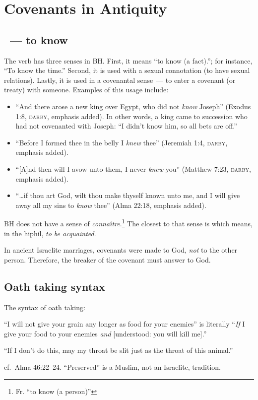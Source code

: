 \chapter{Covenants in Antiquity}\label{app:covenants-in-antiquity}
\section{~--- to know}
The verb  has three senses in BH. First, it means ``to know (a fact).''; for instance, ``To know the time.'' Second, it is used with a sexual connotation (to have sexual relations). Lastly, it is used in a covenantal sense~--- to enter a covenant (or treaty) with someone. Examples of this usage include:
\begin{itemize}
    \item ``And there arose a new king over Egypt, who did not \emph{know} Joseph'' (Exodus 1:8, \textsc{darby}, emphasis added). In other words, a king came to succession who had not covenanted with Joseph: ``I didn't know him, so all bets are off.''
    \item ``Before I formed thee in the belly I \emph{knew} thee'' (Jeremiah 1:4, \textsc{darby}, emphasis added).
    \item ``[A]nd then will I avow unto them, I never \emph{knew} you'' (Matthew 7:23, \textsc{darby}, emphasis added).
    \item ``\dots if thou art God, wilt thou make thyself known unto me, and I will give away all my sins to \emph{know} thee'' (Alma 22:18, emphasis added).
\end{itemize}

BH does not have a sense of \emph{conna\^\i tre}.\footnote{Fr. ``to know (a person)''} The closest to that sense is  which means, in the hiphil, \emph{to be acquainted}.

In ancient Israelite marriages, covenants were made to God, \emph{not} to the other person. Therefore, the breaker of the covenant must answer to God.

\section{Oath taking syntax}
The syntax of oath taking:

``I will not give your grain any longer as food for your enemies'' is literally ``\emph{If} I give your food to your enemies \emph{and} [understood: you will kill me].''

``If I don't do this, may my throat be slit just as the throat of this animal.''

cf.\ Alma 46:22--24. ``Preserved'' is a Muslim, not an Israelite, tradition.
